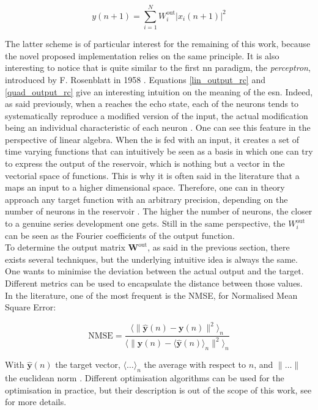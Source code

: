 \begin{equation}
	y(n+1) = \sum_{i=1}^{N} W^{\text{out}}_i |x_i (n+1)|^2
	\label{quad_output_rc}
\end{equation}

The latter scheme is of particular interest for the remaining of this work, because the novel proposed implementation relies on the same principle. It is also interesting to notice that is quite similar to the first \gls{nn} paradigm, the \emph{perceptron}, introduced by F. Rosenblatt in 1958 \cite{Rosenblatt58theperceptron}. Equations \eqref{lin_output_rc} and \eqref{quad_output_rc} give an interesting intuition on the meaning of the \gls{esn}. Indeed, as said previously, when a \rc reaches the echo state, each of the neurons tends to systematically reproduce a modified version of the input, the actual modification being an individual characteristic of each neuron \cite{Jaeger2004}. One can see this feature in the perspective of linear algebra. When the \rcer is fed with an input, it creates a set of time varying functions that can intuitively be seen as a basis in which one can try to express the output of the reservoir, which is nothing but a vector in the vectorial space of functions. This is why it is often said in the literature that a \rcer maps an input to a higher dimensional space. Therefore, one can in theory approach any target function with an arbitrary precision, depending on the number of neurons in the reservoir \cite{Jaeger2004}. The higher the number of neurons, the closer to a genuine series development one gets. Still in the same perspective, the $W^{\text{out}}_i$ can be seen as the Fourier coefficients of the output function.\\

To determine the output matrix $\mathbf{W}^{\text{out}}$, as said in the previous section, there exists several techniques, but the underlying intuitive idea is always the same. One wants to minimise the deviation between the actual output and the target. Different metrics can be used to encapsulate the distance between those values. In the literature, one of the most frequent is the NMSE, for Normalised Mean Square Error:

\begin{equation}
	\text{NMSE} = \frac{\langle \| \hat{\mathbf{y}}(n) - \mathbf{y}(n)\|^2 \rangle _n}{\langle \| \hat{\mathbf{y}}(n) - \langle \hat{\mathbf{y}}(n) \rangle _n \|^2 \rangle _n}
\end{equation}

With $\hat{\mathbf{y}}(n)$ the target vector, $\langle \dots \rangle _n$ the average with respect to $n$, and $\| \dots \|$ the euclidean norm \cite{Duport2016}. Different optimisation algorithms can be used for the optimisation in practice, but their description is out of the scope of this work, see \cite{Lukoeviius2009} for more details.

